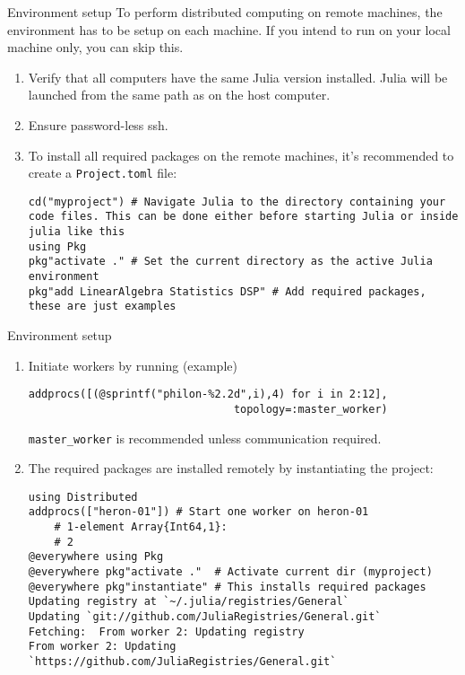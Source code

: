 \documentclass[10pt]{beamer}
\begin{document}
\begin{frame}[fragile]{Environment setup}{}
	To perform distributed computing on remote machines, the environment has to be setup on each machine. If you intend to run on your local machine only, you can skip this.
	\begin{enumerate}[<+->]
		\item Verify that all computers have the same Julia version installed. Julia will be launched from the same path as on the host computer.
		\item Ensure password-less ssh.
		\item To install all required packages on the remote machines, it's recommended to create a \texttt{Project.toml} file:
		\begin{verbatim}
cd("myproject") # Navigate Julia to the directory containing your code files. This can be done either before starting Julia or inside julia like this
using Pkg
pkg"activate ." # Set the current directory as the active Julia environment
pkg"add LinearAlgebra Statistics DSP" # Add required packages, these are just examples
		\end{verbatim}
	\end{enumerate}
\end{frame}

\begin{frame}[fragile]{Environment setup}{}

	\begin{enumerate}[<+->]
		\item Initiate workers by running (example)
		\begin{verbatim}
addprocs([(@sprintf("philon-%2.2d",i),4) for i in 2:12],
                                topology=:master_worker)
		\end{verbatim}
		\verb+master_worker+ is recommended unless communication required.
		\item The required packages are installed remotely by instantiating the project:
		\begin{verbatim}
using Distributed
addprocs(["heron-01"]) # Start one worker on heron-01
	# 1-element Array{Int64,1}:
	# 2
@everywhere using Pkg
@everywhere pkg"activate ."  # Activate current dir (myproject)
@everywhere pkg"instantiate" # This installs required packages
Updating registry at `~/.julia/registries/General`
Updating `git://github.com/JuliaRegistries/General.git`
Fetching:  From worker 2: Updating registry
From worker 2: Updating `https://github.com/JuliaRegistries/General.git`
\end{verbatim}
\end{enumerate}
\end{frame}
\end{document}
